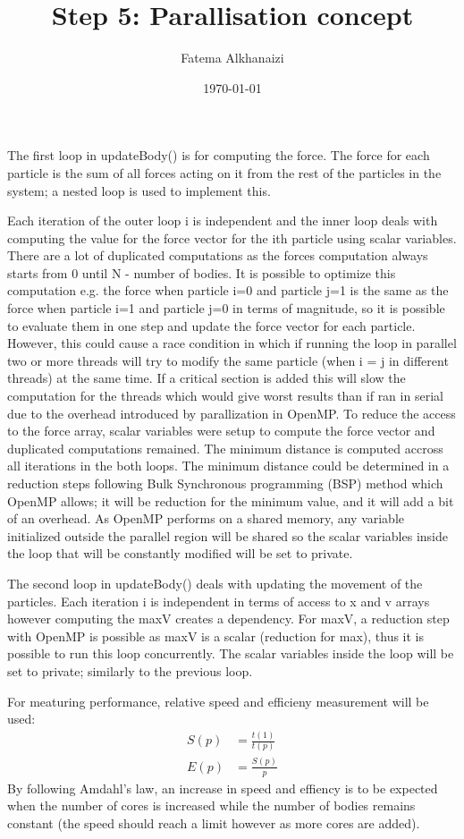 \documentclass[11pt]{article}
\title{Step 5: Parallisation concept}
\author{Fatema Alkhanaizi}
\date{\today}
\begin{document}
    \maketitle
    The first loop in updateBody() is for computing the force. The force for each particle is the sum of all forces acting on it from the rest of the particles in the system; a nested loop is used to implement this. 

    Each iteration of the outer loop i is independent and the inner loop deals with computing the value for the force vector for the ith particle using scalar variables. There are a lot of duplicated computations as the forces computation always starts from 0 until N - number of bodies. It is possible to optimize this computation e.g. the force when  particle i=0 and particle j=1 is the same as the force when particle i=1 and particle j=0 in terms of magnitude, so it is possible to evaluate them in one step and update the force vector for each particle. However, this could cause a race condition in which if running the loop in parallel two or more threads will try to modify the same particle (when i = j in different threads) at the same time. If a critical section is added this will slow the computation for the threads which would give worst results than if ran in serial due to the overhead introduced by parallization in OpenMP. To reduce the access to the force array, scalar variables were setup to compute the force vector and duplicated computations remained. The minimum distance is computed accross all iterations in the both loops. The minimum distance could be determined in a reduction steps following Bulk Synchronous programming (BSP) method which OpenMP allows; it will be reduction for the minimum value, and it will add a bit of an overhead. As OpenMP performs on a shared memory, any variable initialized outside the parallel region will be shared so the scalar variables inside the loop that will be constantly modified will be set to private.

    The second loop in updateBody() deals with updating the movement of the particles. Each iteration i is independent in terms of access to x and v arrays however computing the maxV creates a dependency. For maxV, a reduction step with OpenMP is possible  as maxV is a scalar (reduction for max), thus it is possible to run this loop concurrently. The scalar variables inside the loop will be set to private; similarly to the previous loop.

For meaturing performance, relative speed and efficieny measurement will be used:
\begin{align*}
    S(p) &= \frac{t(1)}{t(p)} \\
    E(p) &= \frac{S(p)}{p}
\end{align*}
By following Amdahl's law, an increase in speed and effiency is to be expected when the number of cores is increased while the number of bodies remains constant (the speed should reach a limit however as more cores are added). 
\end{document}

